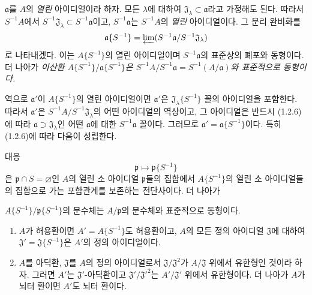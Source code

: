\begin{env}[7.6.9]
\label{0.7.6.9-ko}
$\mathfrak a$를 $A$의 \emph{열린} 아이디얼이라 하자. 모든
$\lambda$에 대하여
$\mathfrak J_\lambda\subset\mathfrak a$라고 가정해도 된다. 따라서
$S^{-1}A$에서
$S^{-1}\mathfrak J_\lambda\subset S^{-1}\mathfrak a$이고,
$S^{-1}\mathfrak a$는 $S^{-1}A$의 \emph{열린} 아이디얼이다. 그
분리 완비화를
\[
  \mathfrak a\{S^{-1}\}
  =\varprojlim
  (S^{-1}\mathfrak a/S^{-1}\mathfrak J_\lambda)
\]
로 나타내겠다. 이는 $A\{S^{-1}\}$의 열린 아이디얼이며
$S^{-1}\mathfrak a$의 표준상의 폐포와 동형이다. 더 나아가
\emph{이산환 $A\{S^{-1}\}/\mathfrak a\{S^{-1}\}$은
$S^{-1}A/S^{-1}\mathfrak a=S^{-1}(A/\mathfrak a)$와 표준적으로
동형이다.}

역으로 $\mathfrak a'$이 $A\{S^{-1}\}$의 열린 아이디얼이면
$\mathfrak a'$은 $\mathfrak J_\lambda\{S^{-1}\}$ 꼴의 아이디얼을
포함한다. 따라서 $\mathfrak a'$은
$S^{-1}A/S^{-1}\mathfrak J_\lambda$의 어떤 아이디얼의 역상이고,
그 아이디얼은 반드시 (1.2.6)에 따라
$\mathfrak a\supset\mathfrak J_\lambda$인 어떤 $\mathfrak a$에 대한
$S^{-1}\mathfrak a$ 꼴이다. 그러므로
$\mathfrak a'=\mathfrak a\{S^{-1}\}$이다. 특히 (1.2.6)에 따라
다음이 성립한다.
\end{env}

\begin{proposition}[7.6.10]
\label{0.7.6.10-ko}
대응
\[
  \mathfrak p\longmapsto\mathfrak p\{S^{-1}\}
\]
은 $\mathfrak p\cap S=\varnothing$인 $A$의 열린 소 아이디얼
$\mathfrak p$들의 집합에서 $A\{S^{-1}\}$의 열린 소 아이디얼들의
집합으로 가는 포함관계를 보존하는 전단사이다. 더 나아가


$A\{S^{-1}\}/\mathfrak p\{S^{-1}\}$의 분수체는
$A/\mathfrak p$의 분수체와 표준적으로 동형이다.
\end{proposition}

\begin{proposition}[7.6.11]
\label{0.7.6.11-ko}
\begin{enumerate}
  \item[(i)] $A$가 허용환이면 $A'=A\{S^{-1}\}$도 허용환이고,
    $A$의 모든 정의 아이디얼 $\mathfrak J$에 대하여
    $\mathfrak J'=\mathfrak J\{S^{-1}\}$은 $A'$의 정의
    아이디얼이다.
  \item[(ii)] $A$를 아딕환, $\mathfrak J$를 $A$의 정의
    아이디얼로서 $\mathfrak J/\mathfrak J^2$가
    $A/\mathfrak J$ 위에서 유한형인 것이라 하자. 그러면 $A'$는
    $\mathfrak J'$-아딕환이고
    $\mathfrak J'/\mathfrak J'^2$는 $A'/\mathfrak J'$ 위에서
    유한형이다. 더 나아가 $A$가 뇌터 환이면 $A'$도 뇌터 환이다.
\end{enumerate}
\end{proposition}

